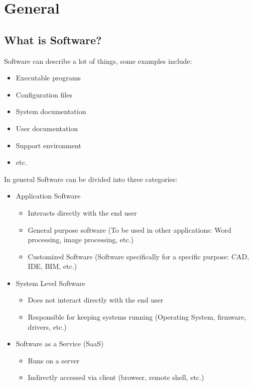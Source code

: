 \documentclass[
../../Software_Engineering_Summary.tex,
]
{subfiles}
\begin{document}
\section{General}
\subsection{What is Software?}
Software can describe a lot of things, some examples include:

\begin{greenbox*}
    \begin{itemize}
        \item Executable programs
        \item Configuration files
        \item System documentation
        \item User documentation
        \item Support environment
        \item etc.
    \end{itemize}
\end{greenbox*}

In general Software can be divided into three categories:

\begin{greenbox*}
        \begin{itemize}
        \item{Application Software}
        \begin{itemize}
            \item Interacts directly with the end user
            \item General purpose software (To be used in other applications: Word processing, image processing, etc.)
            \item Customized Software (Software specifically for a specific purpose: CAD, IDE, BIM, etc.)
        \end{itemize}
        \item System Level Software
        \begin{itemize}
            \item Does not interact directly with the end user
            \item Responsible for keeping systems running (Operating System, firmware, drivers, etc.)
        \end{itemize}
        \item Software as a Service (SaaS)
        \begin{itemize}
            \item Runs on a server
            \item Indirectly accessed via client (browser, remote shell, etc.)
        \end{itemize}
    \end{itemize}
\end{greenbox*}
\end{document}

